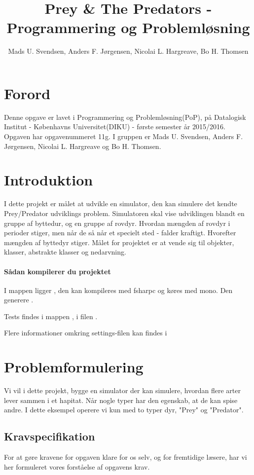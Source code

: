 \documentclass[a4paper]{article}
\title{Prey \& The Predators - Programmering og Problemløsning}
\author{Mads U. Svendsen, Anders F. Jørgensen, Nicolai L. Hargreave, Bo H. Thomsen}
\begin{document}
	\maketitle
  \tableofcontents
\section{Forord}
  Denne opgave er lavet i Programmering og Problemløsning(PoP),
    på Datalogisk Institut - Københavns Universitet(DIKU) - første semester år 2015/2016.
    Opgaven har opgavenummeret 11g.
    I gruppen er Mads U. Svendsen, Anders F. Jørgensen, Nicolai L. Hargreave og Bo H. Thomsen.
\newpage
    
\section{Introduktion} \label{sec:introduction}
   I dette projekt er målet at udvikle en simulator,
   den kan simulere det kendte Prey/Predator udviklings problem.
   Simulatoren skal vise udviklingen blandt en gruppe af byttedur, 
   og en gruppe af rovdyr. Hvordan mængden af rovdyr i perioder stiger,
   men når de så når et specielt sted - falder kraftigt. Hvorefter mængden af byttedyr stiger.
   Målet for projektet er at vende sig til objekter, klasser, abstrakte klasser og nedarvning.

  \paragraph*{Sådan kompilerer du projektet\\}
    I  mappen ligger ,
    den kan kompileres med fsharpc og køres med mono.
    Den generere .

    Tests findes i  mappen , i filen .

    Flere informationer omkring settings-filen kan findes i 

\section{Problemformulering} \label{sec:problem}
  Vi vil i dette projekt, bygge en simulator der kan simulere,
  hvordan flere arter lever sammen i et hapitat.
  Når nogle typer har den egenskab, at de kan spise andre.
  I dette eksempel operere vi kun med to typer dyr, "Prey" og "Predator".

  \subsection{Kravspecifikation} \label{ssec:demands}
    For at gøre kravene for opgaven klare for os selv, og for fremtidige læsere,
    har vi her formuleret vores forståelse af opgavens krav.
\end{document}
